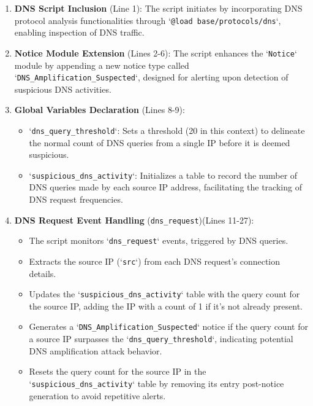 \begin{enumerate}
    
    \item \textbf{DNS Script Inclusion} (Line 1): The script initiates by incorporating DNS protocol analysis functionalities through `\texttt{@load base/protocols/dns}`, enabling inspection of DNS traffic.

    \item \textbf{Notice Module Extension} (Lines 2-6): The script enhances the `\texttt{Notice}` module by appending a new notice type called `\texttt{DNS\_Amplification\_Suspected}`, designed for alerting upon detection of suspicious DNS activities.

    \item \textbf{Global Variables Declaration} (Lines 8-9):
    \begin{itemize}
        \item `\texttt{dns\_query\_threshold}`: Sets a threshold (20 in this context) to delineate the normal count of DNS queries from a single IP before it is deemed suspicious.
        \item `\texttt{suspicious\_dns\_activity}`: Initializes a table to record the number of DNS queries made by each source IP address, facilitating the tracking of DNS request frequencies.
    \end{itemize}

    \item \textbf{DNS Request Event Handling} (\texttt{dns\_request})(Lines 11-27):
    \begin{itemize}
        \item The script monitors `\texttt{dns\_request}` events, triggered by DNS queries.
        \item Extracts the source IP (`\texttt{src}`) from each DNS request's connection details.
        \item Updates the `\texttt{suspicious\_dns\_activity}` table with the query count for the source IP, adding the IP with a count of 1 if it's not already present.
        \item Generates a `\texttt{DNS\_Amplification\_Suspected}` notice if the query count for a source IP surpasses the `\texttt{dns\_query\_threshold}`, indicating potential DNS amplification attack behavior.
        \item Resets the query count for the source IP in the `\texttt{suspicious\_dns\_activity}` table by removing its entry post-notice generation to avoid repetitive alerts.
    \end{itemize}



\end{enumerate}
